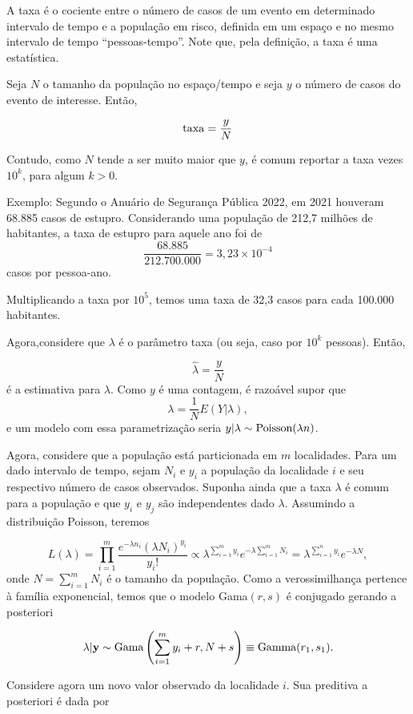 \documentclass[
  letterpaper,
  DIV=11,
  numbers=noendperiod]{scrreprt}
\theoremstyle{plain}
\theoremstyle{definition}
\theoremstyle{definition}
\theoremstyle{remark}
\begin{document}
A taxa é o cociente entre o número de casos de um evento em determinado
intervalo de tempo e a população em risco, definida em um espaço e no
mesmo intervalo de tempo ``pessoas-tempo''. Note que, pela definição, a
taxa é uma estatística.

Seja \(N\) o tamanho da população no espaço/tempo e seja \(y\) o número
de casos do evento de interesse. Então,

\[\hbox{taxa} = \frac{y}{N}\]

Contudo, como \(N\) tende a ser muito maior que \(y\), é comum reportar
a taxa vezes \(10^k\), para algum \(k>0\).

Exemplo: Segundo o Anuário de Segurança Pública 2022, em 2021 houveram
68.885 casos de estupro. Considerando uma população de 212,7 milhões de
habitantes, a taxa de estupro para aquele ano foi de
\[\frac{68.885}{212.700.000}=3,23\times 10^{-4}\] casos por pessoa-ano.

Multiplicando a taxa por \(10^5\), temos uma taxa de 32,3 casos para
cada 100.000 habitantes.

Agora,considere que \(\lambda\) é o parâmetro taxa (ou seja, caso por
\(10^k\) pessoas). Então,

\[\hat{\lambda}=\frac{y}{N}\] é a estimativa para \(\lambda\). Como
\(y\) é uma contagem, é razoável supor que
\[\lambda =\frac{1}{N}E(Y|\lambda),\] e um modelo com essa
parametrização seria \(y|\lambda\sim\hbox{Poisson}(\lambda n)\).

Agora, considere que a população está particionada em \(m\) localidades.
Para um dado intervalo de tempo, sejam \(N_i\) e \(y_i\) a população da
localidade \(i\) e seu respectivo número de casos observados. Suponha
ainda que a taxa \(\lambda\) é comum para a população e que \(y_i\) e
\(y_j\) são independentes dado \(\lambda\). Assumindo a distribuição
Poisson, teremos

\[L(\lambda)=\prod_{i=1}^m\frac{e^{-\lambda n_i}(\lambda N_i)^{y_i}}{y_i!}\varpropto \lambda^{\sum_{i=1}^m y_i}e^{-\lambda \sum_{i=1}^m N_i}=\lambda^{\sum_{i=1}^n y_i}e^{-\lambda N},\]
onde \(N=\sum_{i=1}^m N_i\) é o tamanho da população. Como a
verossimilhança pertence à família exponencial, temos que o modelo
Gama\((r,s)\) é conjugado gerando a posteriori

\[\lambda|\mathbf{y}\sim\hbox{Gama}\left(\sum_{i=1}^{m}y_i+r,N+s\right)\equiv \hbox{Gamma}(r_1,s_1).\]

Considere agora um novo valor observado da localidade \(i\). Sua
preditiva a posteriori é dada por
\end{document}
